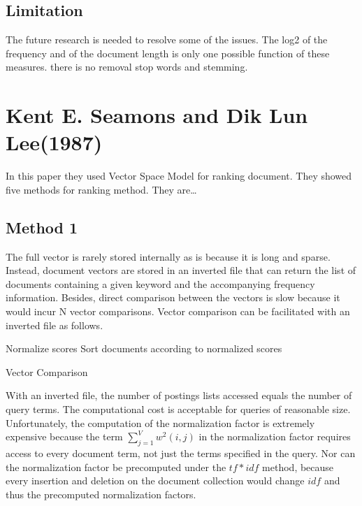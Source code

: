 \subsection{Limitation}

The future research is needed to resolve some of the issues. The log2 of the frequency and of the document length is only one possible function of these measures. there is no removal stop words and stemming.

\section{Kent E. Seamons and Dik Lun Lee(1987)}

In this paper they used Vector Space Model for ranking document. They showed five methods for ranking method. They are…

\subsection{Method 1}

The full vector is rarely stored internally as is because it is long and sparse. Instead, document vectors are stored in an inverted file that can return the list of documents containing a given keyword and the accompanying frequency information. Besides, direct comparison between the vectors is slow because it would incur N vector comparisons. Vector comparison can be facilitated with an inverted file as follows.


\begin{algorithm}[H]


Normalize scores\;
Sort documents according to normalized scores\;

\caption{Vector Comparison}

\end{algorithm}


With an inverted file, the number of postings lists accessed equals the number of query terms. The computational cost is acceptable for queries of reasonable size. Unfortunately, the computation of the normalization factor is extremely expensive because the term \(\sum_{j=1}^{V}w^2(i,j)\) in the normalization factor requires access to every document term, not just the terms specified in the query. Nor can the normalization factor be precomputed under the \(tf *idf\)  method, because every insertion and deletion on the document collection would change $idf$ and thus the precomputed normalization factors.


